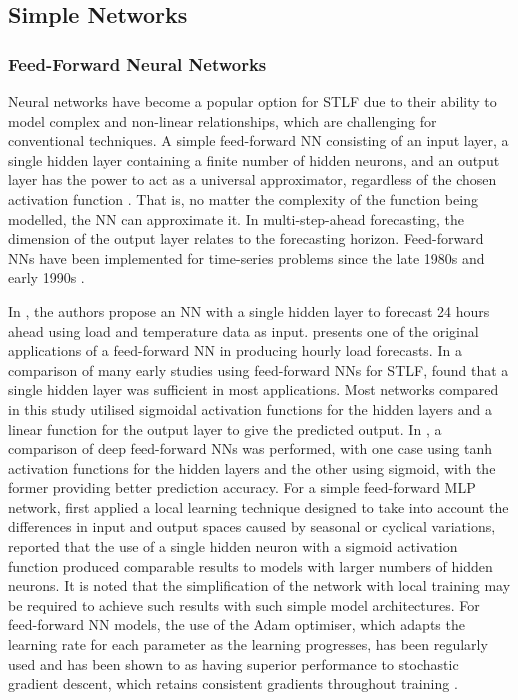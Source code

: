 \documentclass[mstat,12pt]{unswthesis}
\begin{document}
\subsection{Simple Networks}
\subsubsection{Feed-Forward Neural Networks}
Neural networks have become a popular option for STLF due to their ability to model complex and non-linear relationships, which are challenging for conventional techniques. A simple feed-forward NN consisting of an input layer, a single hidden layer containing a finite number of hidden neurons, and an output layer has the power to act as a universal approximator, regardless of the chosen activation function \cite{Csaji2001}\cite{Gasparin2021}. That is, no matter the complexity of the function being modelled, the NN can approximate it. In multi-step-ahead forecasting, the dimension of the output layer relates to the forecasting horizon. Feed-forward NNs have been implemented for time-series problems since the late 1980s and early 1990s \cite{Czernichow1996}. 

In \cite{Park1991}, the authors propose an NN with a single hidden layer to forecast 24 hours ahead using load and temperature data as input. \cite{Srinivasan1994} presents one of the original applications of a feed-forward NN in producing hourly load forecasts. In a comparison of many early studies using feed-forward NNs for STLF, \cite{Hippert2001} found that a single hidden layer was sufficient in most applications. Most networks compared in this study utilised sigmoidal activation functions for the hidden layers and a linear function for the output layer to give the predicted output. In \cite{Mohammad2018}, a comparison of deep feed-forward NNs was performed, with one case using tanh activation functions for the hidden layers and the other using sigmoid, with the former providing better prediction accuracy. For a simple feed-forward MLP network, \cite{Dudek2013} first applied a local learning technique designed to take into account the differences in input and output spaces caused by seasonal or cyclical variations, reported that the use of a single hidden neuron with a sigmoid activation function produced comparable results to models with larger numbers of hidden neurons. It is noted that the simplification of the network with local training may be required to achieve such results with such simple model architectures. For feed-forward NN models, the use of the Adam optimiser, which adapts the learning rate for each parameter as the learning progresses, has been regularly used \cite{Chandra2021}\cite{Gasparin2021}\cite{Chen2018} and has been shown to as having superior performance to stochastic gradient descent, which retains consistent gradients throughout training \cite{Hippert2001}.
\end{document}
